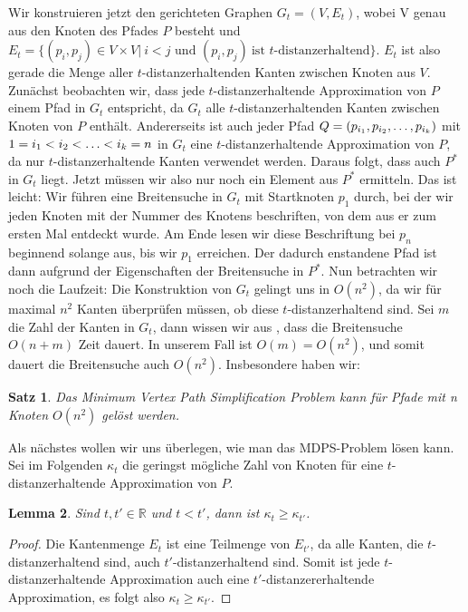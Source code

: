 \documentclass[11pt]{article}
\newcommand{\R}{\mathbb{R}}
\newtheorem{theorem}{Satz}[section]
\newtheorem{lemma}[theorem]{Lemma}
\begin{document}
    Wir konstruieren jetzt den gerichteten Graphen $G_t = (V,E_t)$, wobei V genau aus den Knoten des Pfades $P$ besteht und 
    $E_t = \{(p_i, p_j) \in V\times V|\ i < j \text{ und } (p_i,p_j)\ \text{ist $t$-distanzerhaltend}\}$. $E_t$ ist also gerade die Menge aller $t$-distanzerhaltenden Kanten zwischen Knoten aus $V$. Zunächst beobachten wir, dass jede $t$-distanzerhaltende Approximation von $P$ einem Pfad in $G_t$ entspricht, da $G_t$ alle $t$-distanzerhaltenden Kanten zwischen Knoten von $P$ enthält. Andererseits ist auch jeder Pfad $Q = (p_{i_1}, p_{i_2}, \mathellipsis, p_{i_k})$ mit $1 = i_1 < i_2 < \mathellipsis < i_k = n$ in $G_t$ eine $t$-distanzerhaltende Approximation von $P$, da nur $t$-distanzerhaltende Kanten verwendet werden. Daraus folgt, dass auch $P^*$ in $G_t$ liegt. Jetzt müssen wir also nur noch ein Element aus $P^*$ ermitteln. Das ist leicht: Wir führen eine Breitensuche in $G_t$ mit Startknoten $p_1$ durch, bei der wir jeden Knoten mit der Nummer des Knotens beschriften, von dem aus er zum ersten Mal entdeckt wurde. Am Ende lesen wir diese Beschriftung bei $p_n$ beginnend solange aus, bis wir $p_1$ erreichen. Der dadurch enstandene Pfad ist dann aufgrund der Eigenschaften der Breitensuche in $P^*$. 
    Nun betrachten wir noch die Laufzeit: Die Konstruktion von $G_t$ gelingt uns in $O(n^2)$, da wir für maximal $n^2$ Kanten überprüfen müssen, ob diese $t$-distanzerhaltend sind. Sei $m$ die Zahl der Kanten in $G_t$, dann wissen wir aus  \cite{hagerup}, dass die Breitensuche $O(n+m)$ Zeit dauert. In unserem Fall ist $O(m) = O(n^2)$, und somit dauert die Breitensuche auch $O(n^2)$. Insbesondere haben wir:
    \begin{theorem}
    	Das Minimum Vertex Path Simplification Problem kann für Pfade mit n Knoten $O(n^2)$ gelöst werden.
    \end{theorem} 
    
    Als nächstes wollen wir uns überlegen, wie man das MDPS-Problem lösen kann. Sei im Folgenden $\kappa_t$ die geringst mögliche Zahl von Knoten für eine $t$-distanzerhaltende Approximation von $P$.
	\begin{lemma}
		Sind $t, t' \in \R$ und $t < t'$, dann ist $\kappa_t \geq \kappa_{t'}$.
	\end{lemma}
	\begin{proof}
		Die Kantenmenge $E_t$ ist eine Teilmenge von $E_{t'}$, da alle Kanten, die $t$-distanzerhaltend sind, auch $t'$-distanzerhaltend sind. Somit ist jede $t$-distanzerhaltende Approximation auch eine $t'$-distanzererhaltende Approximation, es folgt also $\kappa_t \geq \kappa_{t'}$.
	\end{proof}
	
\end{document}
